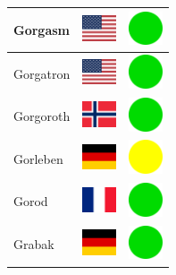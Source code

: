 \documentclass[12pt, a4paper, twoside]{report}
\begin{document}
\begin{center}
\begin{longtable}{|p{5cm}|p{2cm}|p{2cm}|}
 Gorgasm                                                    & \includegraphics[width=1cm]{../img/flags/us} &   \includegraphics[width=1cm]{../likes/y} \\ \hline
 Gorgatron                                                  & \includegraphics[width=1cm]{../img/flags/us} &   \includegraphics[width=1cm]{../likes/y} \\ \hline
 Gorgoroth                                                  & \includegraphics[width=1cm]{../img/flags/no} &   \includegraphics[width=1cm]{../likes/y} \\ \hline
 Gorleben                                                   & \includegraphics[width=1cm]{../img/flags/de} &   \includegraphics[width=1cm]{../likes/m} \\ \hline
 Gorod                                                      & \includegraphics[width=1cm]{../img/flags/fr} &   \includegraphics[width=1cm]{../likes/y} \\ \hline
 Grabak                                                     & \includegraphics[width=1cm]{../img/flags/de} &   \includegraphics[width=1cm]{../likes/y} \\ \hline

\end{longtable}
\end{center}
\end{document}
